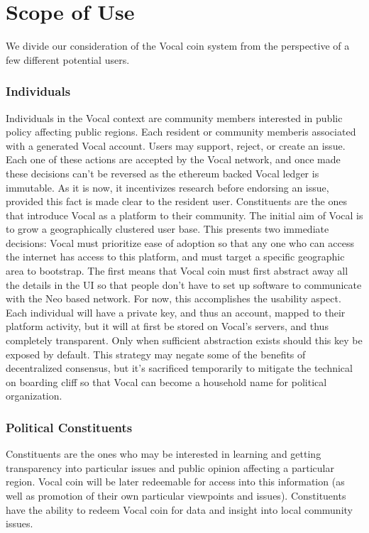 \documentclass[conference]{IEEEtran}
\begin{document}
    \section{Scope of Use}

    We divide our consideration of the Vocal coin system from the perspective of a few different potential users.

    \subsubsection{Individuals}
    Individuals in the Vocal context are community members interested in public policy affecting public regions. Each resident or community memberis associated with a generated Vocal account. Users may support, reject, or create an issue. Each one of these actions are accepted by the Vocal network, and once made these decisions can't be reversed as the ethereum backed Vocal ledger is immutable. As it is now, it incentivizes research before endorsing an issue, provided this fact is made clear to the resident user.
    Constituents are the ones that introduce Vocal as a platform to their community. The initial aim of Vocal is to grow a geographically clustered user base. This presents two immediate decisions: Vocal must prioritize ease of adoption so that any one who can access the internet has access to this platform, and must target a specific geographic area to bootstrap.
    The first means that Vocal coin must first abstract away all the details in the UI so that people don't have to set up software to communicate with the Neo based network. For now, this accomplishes the usability aspect. Each individual will have a private key, and thus an account, mapped to their platform activity, but it will at first be stored on Vocal's servers, and thus completely transparent. Only when sufficient abstraction exists should this key be exposed by default. This strategy may negate some of the benefits of decentralized consensus, but it's sacrificed temporarily to mitigate the technical on boarding cliff so that Vocal can become a household name for political organization. 

    \subsubsection{Political Constituents}
    Constituents are the ones who may be interested in learning and getting transparency into particular issues and public opinion affecting a particular region. Vocal coin will be later redeemable for access into this information (as well as promotion of their own particular viewpoints and issues). Constituents have the ability to redeem Vocal coin for data and insight into local community issues.
\end{document}
